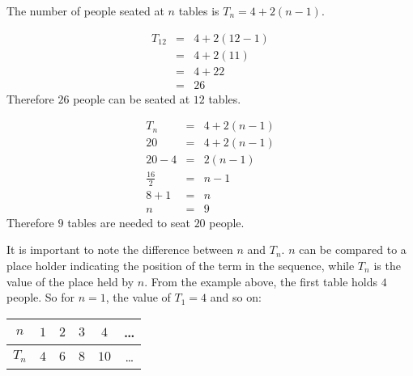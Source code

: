 \begin{wex}
{
The number of people seated at $n$ tables is $T_n = 4 + 2(n-1)$.


\begin{eqnarray*}
T_{12} &=& 4 + 2  (12 - 1) \\
&=& 4 + 2(11) \\
&=& 4 + 22 \\
&=& 26
\end{eqnarray*}
Therefore $26$ people can be seated at $12$ tables.

\begin{eqnarray*}
T_n &=& 4 + 2  (n - 1) \\
20 &=& 4 + 2  (n - 1) \\
20 - 4 &=& 2  (n - 1) \\
\frac{16}{2} &=& n - 1 \\
8 + 1 &=& n \\
n &=& 9
\end{eqnarray*}
Therefore $9$ tables are needed to seat $20$ people.
}
\end{wex}

It is important to note the difference between $n$ and ${T}_{n}$. $n$ can be compared to a place holder indicating the position of the term in the sequence, 
while ${T}_{n}$ is the value of the place held by $n$. From the example above, the first table holds $4$ people. So for $n=1$, the value of ${T}_{1}=4$ and so on:\par 
    
\begin{center}
\begin{tabular}{|c|c|c|c|c|c|}
\hline $n$ & $1$ & $2$ & $3$ & $4$ & \ldots \\
\hline $T_n$ & $4$ & $6$ & $8$ & $10$ & \ldots \\
\hline
\end{tabular}
\end{center}


